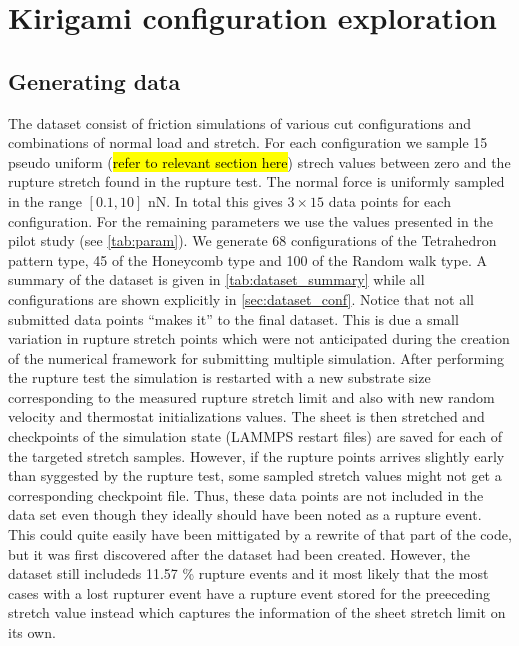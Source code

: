 \chapter{Kirigami configuration exploration}

\section{Generating data}
The dataset consist of friction simulations of various cut configurations and combinations of normal load and stretch. For each configuration we
sample 15 pseudo uniform (\hl{refer to relevant section here}) strech values
between zero and the rupture stretch found in the rupture test. The normal force
is uniformly sampled in the range $[0.1, 10]$ nN. In total this gives $3\times
15$ data points for each configuration. For the remaining parameters we use the
values presented in the pilot study (see \cref{tab:param}). We generate 68
configurations of the Tetrahedron pattern type, 45 of the Honeycomb type and 100
of the Random walk type. A summary of the dataset is given in \cref{tab:dataset_summary} while all configurations are shown explicitly in \cref{sec:dataset_conf}. Notice that not all submitted data points ``makes it'' to the final dataset. This is due a small variation in rupture stretch points which were not anticipated during the creation of the numerical framework for submitting multiple simulation. After performing the rupture test the simulation is restarted
with a new substrate size corresponding to the measured rupture stretch limit
and also with new random velocity and thermostat initializations values. The sheet is then stretched and checkpoints of the simulation state (LAMMPS restart files) are saved for each of the targeted stretch samples. However, if the rupture points arrives slightly early than syggested by the rupture test, some sampled stretch values might not get a corresponding checkpoint file. Thus, these data points are not included in the data set even though they ideally should have been noted as a rupture event. This could quite easily have been mittigated by a rewrite of that part of the code, but it was first discovered after the dataset had been created. However, the dataset still includeds 11.57 \% rupture events and it most likely that the most cases with a lost rupturer event have a rupture event stored for the preeceding stretch value instead which captures the information of the sheet stretch limit on its own. 

